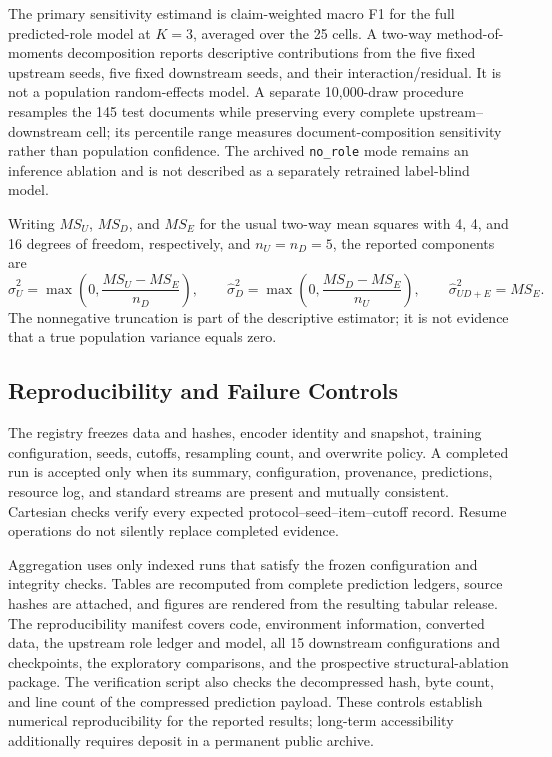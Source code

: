 \documentclass[applsci,article,submit,moreauthors]{Definitions/mdpi}
\begin{document}
The primary sensitivity estimand is claim-weighted macro F1 for the full predicted-role model at $K=3$, averaged over the 25 cells. A two-way method-of-moments decomposition reports descriptive contributions from the five fixed upstream seeds, five fixed downstream seeds, and their interaction/residual. It is not a population random-effects model. A separate 10,000-draw procedure resamples the 145 test documents while preserving every complete upstream--downstream cell; its percentile range measures document-composition sensitivity rather than population confidence. The archived \texttt{no\_role} mode remains an inference ablation and is not described as a separately retrained label-blind model.

Writing $MS_U$, $MS_D$, and $MS_E$ for the usual two-way mean squares with 4, 4, and 16 degrees of freedom, respectively, and $n_U=n_D=5$, the reported components are
\begin{equation}
\widehat{\sigma}_U^2=\max\!\left(0,\frac{MS_U-MS_E}{n_D}\right),\qquad
\widehat{\sigma}_D^2=\max\!\left(0,\frac{MS_D-MS_E}{n_U}\right),\qquad
\widehat{\sigma}_{UD+E}^2=MS_E.
\end{equation}
The nonnegative truncation is part of the descriptive estimator; it is not evidence that a true population variance equals zero.

\subsection{Reproducibility and Failure Controls}
The registry freezes data and hashes, encoder identity and snapshot, training configuration, seeds, cutoffs, resampling count, and overwrite policy. A completed run is accepted only when its summary, configuration, provenance, predictions, resource log, and standard streams are present and mutually consistent. Cartesian checks verify every expected protocol--seed--item--cutoff record. Resume operations do not silently replace completed evidence.

Aggregation uses only indexed runs that satisfy the frozen configuration and integrity checks. Tables are recomputed from complete prediction ledgers, source hashes are attached, and figures are rendered from the resulting tabular release. The reproducibility manifest covers code, environment information, converted data, the upstream role ledger and model, all 15 downstream configurations and checkpoints, the exploratory comparisons, and the prospective structural-ablation package. The verification script also checks the decompressed hash, byte count, and line count of the compressed prediction payload. These controls establish numerical reproducibility for the reported results; long-term accessibility additionally requires deposit in a permanent public archive.
\end{document}
